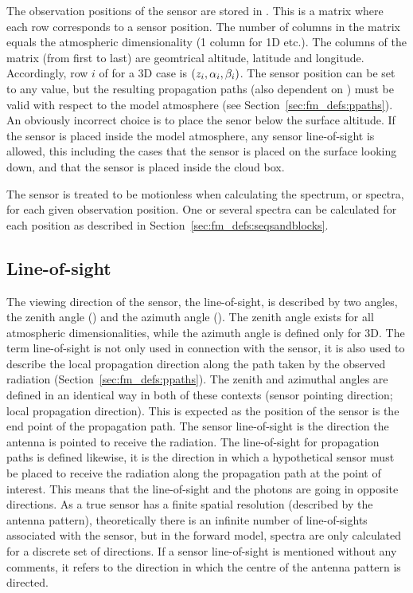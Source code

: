 The observation positions of the sensor are stored in
. This is a matrix where each row corresponds to
a sensor position. The number of columns in the matrix equals the
atmospheric dimensionality (1 column for 1D etc.). The columns of the
matrix (from first to last) are geomtrical altitude, latitude and longitude.
Accordingly, row $i$ of  for a 3D case is
$(z_{i},\alpha_{i},\beta_{i})$. The sensor position can be set to any
value, but the resulting propagation paths (also dependent on
) must be valid with respect to the model
atmosphere (see Section~\ref{sec:fm_defs:ppaths}). An obviously
incorrect choice is to place the senor below the surface altitude. If
the sensor is placed inside the model atmosphere, any sensor
line-of-sight is allowed, this including the cases that the sensor is
placed on the surface looking down, and that the sensor is placed
inside the cloud box.

The sensor is treated to be motionless when calculating the spectrum,
or spectra, for each given observation position. One or several
spectra can be calculated for each position as described in
Section~\ref{sec:fm_defs:seqsandblocks}.


\subsection{Line-of-sight}
\label{sec:fm_defs:los}

The viewing direction of the sensor, the line-of-sight, is described
by two angles, the zenith angle (\ZntAng) and the azimuth angle
(\AzmAng). The zenith angle exists for all atmospheric
dimensionalities, while the azimuth angle is defined only for 3D.
The term line-of-sight is not only used in connection with the sensor,
it is also used to describe the local propagation direction along the
path taken by the observed radiation
(Section~\ref{sec:fm_defs:ppaths}).  The zenith and azimuthal angles
are defined in an identical way in both of these contexts (sensor
pointing direction; local propagation direction). This is expected as
the position of the sensor is the end point of the propagation path.
The sensor line-of-sight is the direction the antenna is pointed to
receive the radiation. The line-of-sight for propagation paths is
defined likewise, it is the direction in which a hypothetical sensor
must be placed to receive the radiation along the propagation path at
the point of interest. This means that the line-of-sight and the
photons are going in opposite directions. As a true sensor has a
finite spatial resolution (described by the antenna pattern),
theoretically there is an infinite number of line-of-sights associated
with the sensor, but in the forward model, spectra are only calculated
for a discrete set of directions. If a sensor line-of-sight is
mentioned without any comments, it refers to the direction in which
the centre of the antenna pattern is directed.

